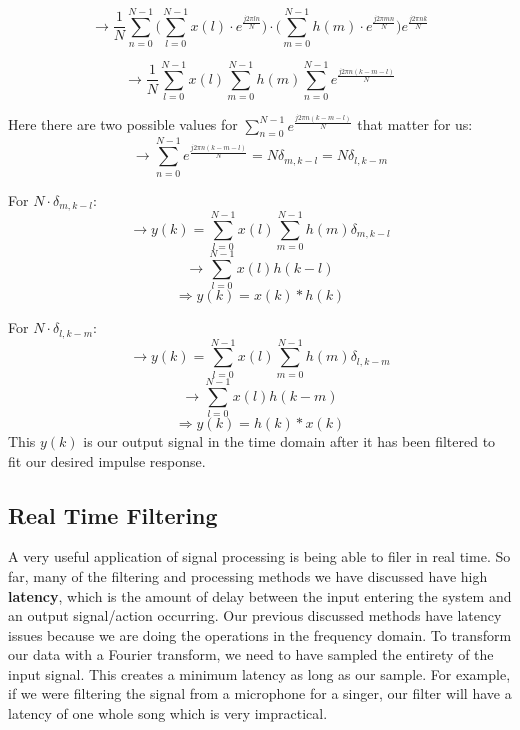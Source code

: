 \documentclass[12pt]{article}
\begin{document}
$$\rightarrow	\frac{1}{N} \sum_{n=0}^{N-1} \Bigg( \sum_{l=0}^{N-1} x(l)\cdot e^{\frac{j2\pi ln}{N}} \Bigg) \cdot \Bigg( \sum_{m=0}^{N-1} h(m)\cdot e^{\frac{j2\pi mn}{N}} \Bigg) e^{\frac{j2\pi nk}{N}} $$

$$\rightarrow \frac{1}{N} \sum_{l=0}^{N-1} x(l) \sum_{m=0}^{N-1} h(m) \sum_{n=0}^{N-1} e^{\frac{j2\pi n(k-m-l)}{N}} $$

Here there are two possible values for $\sum_{n=0}^{N-1} e^{\frac{j2\pi n(k-m-l)}{N}}$ that matter for us:
$$ \rightarrow	\sum_{n=0}^{N-1} e^{\frac{j2\pi n(k-m-l)}{N}}  = N\delta_{m, k-l} = N\delta_{l,k-m} $$

For $N \cdot \delta_{m, k-l}$: 
$$\rightarrow y(k) = \sum_{l=0}^{N-1} x(l) \sum_{m=0}^{N-1} h(m) \delta_{m, k-l}$$ 
$$\rightarrow \sum_{l=0}^{N-1} x(l) h(k-l)$$ 
$$\Rightarrow y(k) = x(k) * h(k) $$

For $N \cdot \delta_{l, k-m}$: 
$$ \rightarrow y(k) = \sum_{l=0}^{N-1} x(l) \sum_{m=0}^{N-1} h(m) \delta_{l, k-m} $$
$$ \rightarrow \sum_{l=0}^{N-1} x(l) h(k-m)$$ 
$$ \Rightarrow y(k) = h(k) * x(k) $$
This $y(k)$ is our output signal in the time domain after it has been filtered to fit our desired impulse response. 
%
\subsection{Real Time Filtering}
A very useful application of signal processing is being able to filer in real time. So far, many of the filtering and processing methods we have discussed have high \textbf{latency}, which is the amount of delay between the input entering the system and an output signal/action occurring. Our previous discussed methods have latency issues because we are doing the operations in the frequency domain. To transform our data with a Fourier transform, we need to have sampled the entirety of the input signal. This creates a minimum latency as long as our sample. For example, if we were filtering the signal from a microphone for a singer, our filter will have a latency of one whole song which is very impractical.
\end{document}

